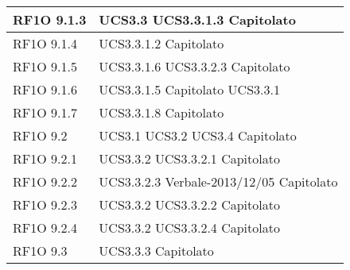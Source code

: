 \begin{center}
\begin{longtable}{ | p{5cm} | p{5cm} |}
        RF1O 9.1.3  &  UCS3.3 \newline  UCS3.3.1.3 \newline  Capitolato \newline  \\ \hline      
        RF1O 9.1.4  &  UCS3.3.1.2 \newline  Capitolato \newline  \\ \hline      
        RF1O 9.1.5 &  UCS3.3.1.6 \newline  UCS3.3.2.3 \newline  Capitolato \newline  \\ \hline      
        RF1O 9.1.6 &  UCS3.3.1.5 \newline  Capitolato \newline  UCS3.3.1 \newline  \\ \hline      
        RF1O 9.1.7 &  UCS3.3.1.8 \newline  Capitolato \newline  \\ \hline      
        RF1O 9.2 &  UCS3.1 \newline  UCS3.2 \newline  UCS3.4 \newline  Capitolato \newline  \\ \hline      
        RF1O 9.2.1  &  UCS3.3.2 \newline  UCS3.3.2.1 \newline  Capitolato \newline  \\ \hline      
        RF1O 9.2.2  &  UCS3.3.2.3 \newline  Verbale-2013/12/05 \newline  Capitolato \newline  \\ \hline      
        RF1O 9.2.3 &  UCS3.3.2 \newline  UCS3.3.2.2 \newline  Capitolato \newline  \\ \hline      
        RF1O 9.2.4 &  UCS3.3.2 \newline  UCS3.3.2.4 \newline  Capitolato \newline  \\ \hline      
        RF1O 9.3 &  UCS3.3.3 \newline  Capitolato \newline  \\ \hline      

\end{longtable}
\end{center}
